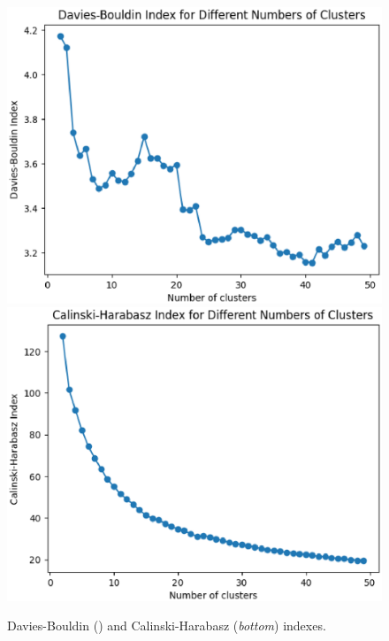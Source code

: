 \documentclass[a4paper, review, endfloat, authoryear]{elsarticle}
\begin{document}
	\begin{figure}[htbp]
		\centering
		\includegraphics[height=0.2\textheight, keepaspectratio]{pics/davis_bouldin.eps}
		\includegraphics[height=0.2\textheight, keepaspectratio]{pics/calinski.eps}
		\caption{Davies-Bouldin () and Calinski-Harabasz (\textit{bottom}) indexes.}\label{fig:fig10}
	\end{figure}
		
\end{document}
